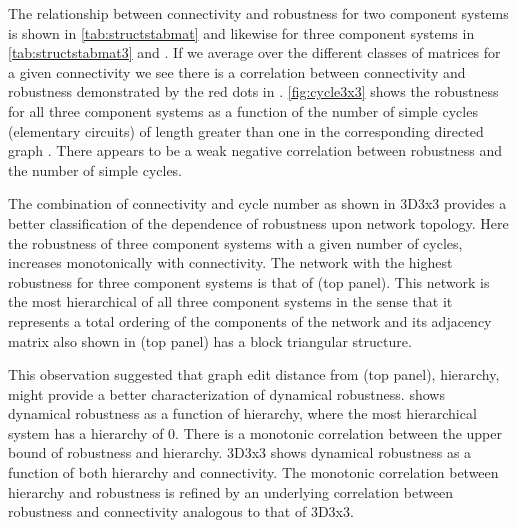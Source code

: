 The relationship between connectivity and robustness for two component systems is shown in \ref{tab:structstabmat} and likewise for three component systems in \ref{tab:structstabmat3} and . If we average over the different classes of matrices for a given connectivity we see there is a correlation between connectivity and robustness demonstrated by the red dots in .
\ref{fig:cycle3x3} shows the robustness for all three component systems as a function of the number of simple cycles (elementary circuits) of length greater than one in the corresponding directed graph \cite{Johnson1975}. There appears to be a weak negative correlation between robustness and the number of simple cycles.

The combination of connectivity and cycle number as shown in 3D3x3 provides a better classification of the dependence of robustness upon network topology. Here the robustness of three component systems with a given number of cycles, increases monotonically with connectivity. The network with the highest robustness for three component systems is that of  (top panel). This network is the most hierarchical of all three component systems in the sense that it represents a total ordering of the components of the network and its adjacency matrix also shown in  (top panel) has a block triangular structure.

This observation suggested that graph edit distance from  (top panel), hierarchy, might provide a better characterization of dynamical robustness.  shows dynamical robustness as a function of hierarchy, where the most hierarchical system has a hierarchy of 0. There is a monotonic correlation between the upper bound of robustness and hierarchy. 3D3x3 shows dynamical robustness as a function of both hierarchy and connectivity. The monotonic correlation between hierarchy and robustness is refined by an underlying correlation between robustness and connectivity analogous to that of 3D3x3.

